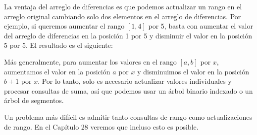 La ventaja del arreglo de diferencias es
que podemos actualizar un rango
en el arreglo original cambiando solo
dos elementos en el arreglo de diferencias.
Por ejemplo, si queremos
aumentar el rango $[1, 4]$ por 5,
basta con aumentar el
valor del arreglo de diferencias en la posición 1 por 5
y disminuir el valor en la posición 5 por 5.
El resultado es el siguiente:

\begin{center}
\end{center}

Más generalmente, para aumentar los valores
en el rango $[a,b]$ por $x$,
aumentamos el valor en la posición $a$ por $x$
y disminuimos el valor en la posición $b+1$ por $x$.
Por lo tanto, solo es necesario actualizar valores individuales
y procesar consultas de suma,
así que podemos usar un árbol binario indexado o un árbol de segmentos.

Un problema más difícil es admitir tanto
consultas de rango como actualizaciones de rango.
En el Capítulo 28 veremos que incluso esto es posible.




